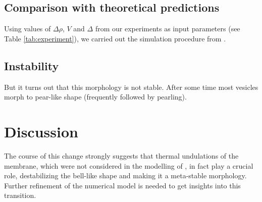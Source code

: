\documentclass[10pt,a4paper,draft]{article}
\begin{document}


\subsection{Comparison with theoretical predictions}
Using values of $\Delta\rho$, $V$ and $\Delta$ from our experiments as input parameters (see Table \ref{tab:experiment}), we carried out the simulation procedure from \cite{Boedec2012}.

\subsection{Instability}
But it turns out that this morphology is not stable. After some time most vesicles morph to pear-like shape (frequently followed by pearling).

\section{Discussion}\label{discussion}
The course of this change strongly suggests that thermal undulations of the membrane, which were not considered in the modelling of \cite{Boedec2012}, in fact play a crucial role, destabilizing the bell-like shape and making it a meta-stable morphology. Further refinement of the numerical model is needed to get insights into this transition.


\end{document}
